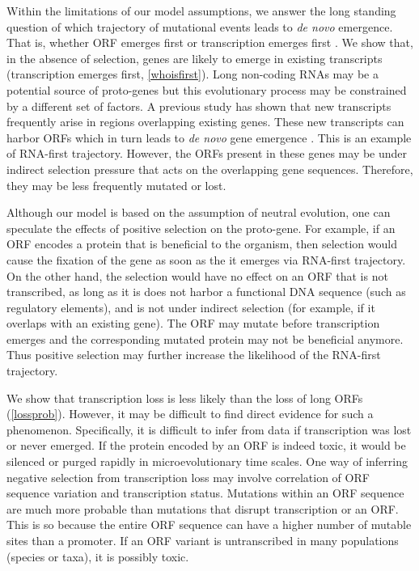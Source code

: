 \documentclass[12pt,a4paper]{article}
\begin{document}
Within the limitations of our model assumptions, we answer the long standing question of which trajectory of mutational events leads to \textit{de novo} emergence. That is, whether ORF emerges first or transcription emerges first \citep{EBB-F1000}. We show that, in the absence of selection, genes are likely to emerge in existing transcripts (transcription emerges first, \autoref{whoisfirst}). Long non-coding RNAs may be a potential source of proto-genes but this evolutionary process may be constrained by a different set of factors. A previous study has shown that new transcripts frequently arise in regions overlapping existing genes. These new transcripts can harbor ORFs which in turn leads to \textit{de novo} gene emergence \citep{albaYeastdenovo}. This is an example of RNA-first trajectory. However, the ORFs present in these genes may be under indirect selection pressure that acts on the overlapping gene sequences. Therefore, they may be less frequently mutated or lost.

Although our model is based on the assumption of neutral evolution, one can speculate the effects of positive selection on the proto-gene. For example, if an ORF encodes a protein that is beneficial to the organism, then selection would cause the fixation of the gene as soon as the it emerges via RNA-first trajectory. On the other hand, the selection would have no effect on an ORF that is not transcribed, as long as it is does not harbor a functional DNA sequence (such as regulatory elements), and is not under indirect selection (for example, if it overlaps with an existing gene). The ORF may mutate before transcription emerges and the corresponding mutated protein may not be beneficial anymore. Thus positive selection may further increase the likelihood of the RNA-first trajectory.

We show that transcription loss is less likely than the loss of long ORFs (\autoref{lossprob}). However, it may be difficult to find direct evidence for such a phenomenon. Specifically, it is difficult to infer from data if transcription was lost or never emerged. If the protein encoded by an ORF is indeed toxic, it would be silenced or purged rapidly in microevolutionary time scales. One way of inferring negative selection from transcription loss may involve correlation of ORF sequence variation and transcription status. Mutations within an ORF sequence are much more probable than mutations that disrupt transcription or an ORF. This is so because the entire ORF sequence can have a higher number of mutable sites than a promoter. If an ORF variant is untranscribed in many populations (species or taxa), it is possibly toxic.  
\end{document}
